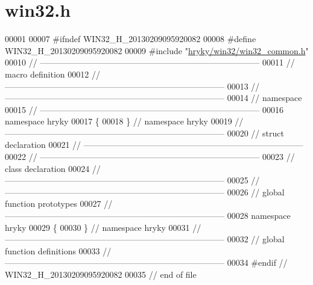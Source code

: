 \hypertarget{win32_8h_source}{\section{win32.\-h}
}

\begin{DoxyCode}
00001 
00007 \textcolor{preprocessor}{#ifndef WIN32\_H\_20130209095920082}
00008 \textcolor{preprocessor}{}\textcolor{preprocessor}{#define WIN32\_H\_20130209095920082}
00009 \textcolor{preprocessor}{}\textcolor{preprocessor}{#include "\hyperlink{win32__common_8h}{hryky/win32/win32_common.h}"}
00010 \textcolor{comment}{//
      ------------------------------------------------------------------------------}
00011 \textcolor{comment}{// macro definition}
00012 \textcolor{comment}{//
      ------------------------------------------------------------------------------}
00013 \textcolor{comment}{//
      ------------------------------------------------------------------------------}
00014 \textcolor{comment}{// namespace}
00015 \textcolor{comment}{//
      ------------------------------------------------------------------------------}
00016 \textcolor{keyword}{namespace }hryky
00017 \{
00018 \} \textcolor{comment}{// namespace hryky}
00019 \textcolor{comment}{//
      ------------------------------------------------------------------------------}
00020 \textcolor{comment}{// struct declaration}
00021 \textcolor{comment}{//
      ------------------------------------------------------------------------------}
00022 \textcolor{comment}{//
      ------------------------------------------------------------------------------}
00023 \textcolor{comment}{// class declaration}
00024 \textcolor{comment}{//
      ------------------------------------------------------------------------------}
00025 \textcolor{comment}{//
      ------------------------------------------------------------------------------}
00026 \textcolor{comment}{// global function prototypes}
00027 \textcolor{comment}{//
      ------------------------------------------------------------------------------}
00028 \textcolor{keyword}{namespace }hryky
00029 \{
00030 \} \textcolor{comment}{// namespace hryky}
00031 \textcolor{comment}{//
      ------------------------------------------------------------------------------}
00032 \textcolor{comment}{// global function definitions}
00033 \textcolor{comment}{//
      ------------------------------------------------------------------------------}
00034 \textcolor{preprocessor}{#endif // WIN32\_H\_20130209095920082}
00035 \textcolor{preprocessor}{}\textcolor{comment}{// end of file}
\end{DoxyCode}
